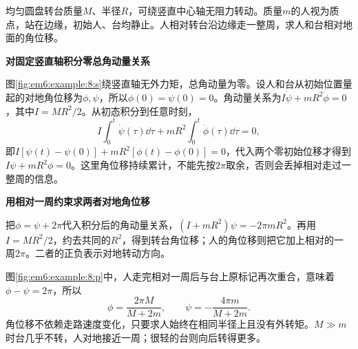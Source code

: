 \begin{question}\begin{example}[人在自由转台边缘走一周]\label{em6:example:8}
均匀圆盘转台质量$M$、半径$R$，可绕竖直中心轴无阻力转动。质量$m$的人视为质点，站在边缘，初始人、台均静止。人相对转台沿边缘走一整周，求人和台相对地面的角位移。
\end{example}
\end{question}
\begin{solution}\textbf{对固定竖直轴积分零总角动量关系}\par\nobreak
图\ref{fig:em6:example:8:s}绕竖直轴无外力矩，总角动量为零。设人和台从初始位置量起的对地角位移为$\phi,\psi$，所以$\phi(0)=\psi(0)=0$。角动量关系为$I\dot\psi+mR^2\dot\phi=0$，其中$I=MR^2/2$。从初态积分到任意时刻，
\[
 I\int_0^t\dot\psi(\tau)\dd\tau
 +mR^2\int_0^t\dot\phi(\tau)\dd\tau=0,
\]
即$I[\psi(t)-\psi(0)]+mR^2[\phi(t)-\phi(0)]=0$，代入两个零初始位移才得到$I\psi+mR^2\phi=0$。这里角位移持续累计，不能先按$2\pi$取余，否则会丢掉相对走过一整周的信息。



\par\medskip{}\noindent\textbf{用相对一周约束求两者对地角位移}\par\nobreak
把$\phi=\psi+2\pi$代入积分后的角动量关系，$(I+mR^2)\psi=-2\pi mR^2$。再用$I=MR^2/2$，约去共同的$R^2$，得到转台角位移；人的角位移则把它加上相对的一周$2\pi$。二者的正负表示对地转动方向。

图\ref{fig:em6:example:8:p}中，人走完相对一周后与台上原标记再次重合，意味着$\phi-\psi=2\pi$，所以
\[\boxed{\phi=\frac{2\pi M}{M+2m},\qquad\psi=-\frac{4\pi m}{M+2m}}.\]
角位移不依赖走路速度变化，只要求人始终在相同半径上且没有外转矩。$M\gg m$时台几乎不转，人对地接近一周；很轻的台则向后转得更多。\end{solution}
